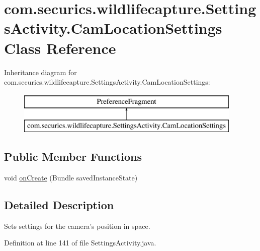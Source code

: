 \hypertarget{classcom_1_1securics_1_1wildlifecapture_1_1_settings_activity_1_1_cam_location_settings}{\section{com.\+securics.\+wildlifecapture.\+Settings\+Activity.\+Cam\+Location\+Settings Class Reference}
\label{classcom_1_1securics_1_1wildlifecapture_1_1_settings_activity_1_1_cam_location_settings}
}
Inheritance diagram for com.\+securics.\+wildlifecapture.\+Settings\+Activity.\+Cam\+Location\+Settings\+:\begin{figure}[H]
\begin{center}
\leavevmode
\includegraphics[height=2.000000cm]{classcom_1_1securics_1_1wildlifecapture_1_1_settings_activity_1_1_cam_location_settings}
\end{center}
\end{figure}
\subsection*{Public Member Functions}
\begin{DoxyCompactItemize}
\item 
void \hyperlink{classcom_1_1securics_1_1wildlifecapture_1_1_settings_activity_1_1_cam_location_settings_aabf93b490341179e6ba824e7e50cf29f}{on\+Create} (Bundle saved\+Instance\+State)
\end{DoxyCompactItemize}


\subsection{Detailed Description}
Sets settings for the camera's position in space. 

Definition at line 141 of file Settings\+Activity.\+java.



